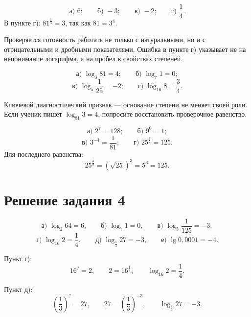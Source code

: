 \newpage
{}

\begin{teacheranswer}[Задание 1]
  \[
    \text{а) }6;
    \qquad
    \text{б) }-3;
    \qquad
    \text{в) }-2;
    \qquad
    \text{г) }\frac14.
  \]
  В пункте г): \(81^{\frac14}=3\), так как \(81=3^4\).
\end{teacheranswer}

\begin{criterionbox}
  Проверяется готовность работать не только с натуральными, но и с
  отрицательными и дробными показателями. Ошибка в пункте г) указывает не
  на непонимание логарифма, а на пробел в свойствах степеней.
\end{criterionbox}

\begin{teacheranswer}[Задание 2]
  \[
    \text{а) }\log_3 81=4;
    \qquad
    \text{б) }\log_7 1=0;
  \]
  \[
    \text{в) }\log_5\frac1{25}=-2;
    \qquad
    \text{г) }\log_{16}8=\frac34.
  \]
\end{teacheranswer}

\begin{criterionbox}
  Ключевой диагностический признак --- основание степени не меняет своей
  роли. Если ученик пишет \(\log_{81}3=4\), попросите восстановить
  проверочное равенство.
\end{criterionbox}

\begin{teacheranswer}[Задание 3]
  \[
    \text{а) }2^7=128;
    \qquad
    \text{б) }9^0=1;
  \]
  \[
    \text{в) }3^{-4}=\frac1{81};
    \qquad
    \text{г) }25^{\frac32}=125.
  \]
  Для последнего равенства:
  \[
    25^{\frac32}=\left(\sqrt{25}\right)^3=5^3=125.
  \]
\end{teacheranswer}

\section*{Решение задания 4}

\begin{teacheranswer}[Вычисления]
  \[
    \text{а) }\log_2 64=6,
    \qquad
    \text{б) }\log_7 1=0,
    \qquad
    \text{в) }\log_5\frac1{125}=-3,
  \]
  \[
    \text{г) }\log_{16}2=\frac14,
    \qquad
    \text{д) }\log_{\frac13}27=-3,
    \qquad
    \text{е) }\lg0{,}0001=-4.
  \]

  Пункт г):
  \[
    16^{?}=2,
    \qquad
    2=16^{\frac14},
    \qquad
    \log_{16}2=\frac14.
  \]

  Пункт д):
  \[
    \left(\frac13\right)^{?}=27,
    \qquad
    27=\left(\frac13\right)^{-3},
    \qquad
    \log_{\frac13}27=-3.
  \]
\end{teacheranswer}

